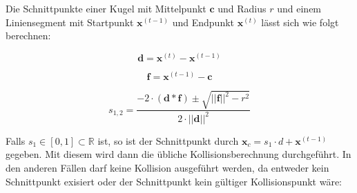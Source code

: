 Die Schnittpunkte einer Kugel mit Mittelpunkt $\textbf{c}$ und Radius $r$ und einem Liniensegment mit Startpunkt  $\textbf{x}^{(t-1)}$ und Endpunkt $\textbf{x}^{(t)}$ lässt sich wie folgt berechnen:

\hspace{-1cm}\begin{minipage}{.333333\linewidth}
	\begin{equation*}
	\textbf{d} = \textbf{x}^{(t)} - \textbf{x}^{(t-1)}
	\end{equation*}
\end{minipage}%
\begin{minipage}{.333333\linewidth}
	\begin{equation*}
	\textbf{f} = \textbf{x}^{(t-1)} - \textbf{c}
	\end{equation*}
\end{minipage}
\begin{minipage}{.333333\linewidth}
	\begin{equation*}
	s_{1,2} = \frac{-2 \cdot (\textbf{d} * \textbf{f}) \pm \sqrt{||\textbf{f}||^2 - r^2}}{2 \cdot ||\textbf{d}||^2}
	\end{equation*}
\end{minipage}
\vspace{0.3cm}

Falls $s_1 \in [0, 1] \subset \mathbb{R}$ ist, so ist der Schnittpunkt durch $\textbf{x}_c = s_1 \cdot d + \textbf{x}^{(t-1)}$ gegeben. 
Mit diesem wird dann die übliche Kollisionsberechnung durchgeführt.
In den anderen Fällen darf keine Kollision ausgeführt werden, da entweder kein Schnittpunkt exisiert oder der Schnittpunkt kein gültiger Kollisionspunkt wäre:

